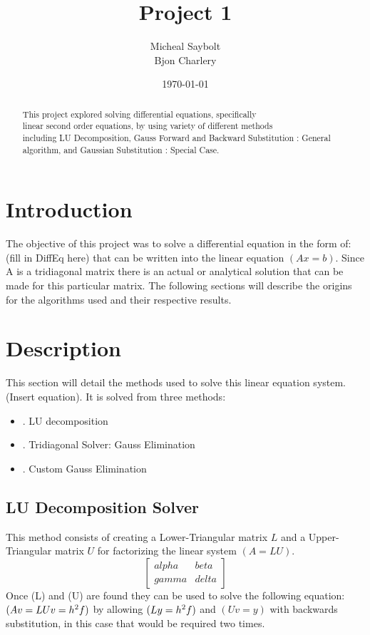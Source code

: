 \documentclass[12pt]{article}
\begin{document}
	\title{Project 1}
	\author{Micheal Saybolt \\ Bjon Charlery}
	
	\date{\today}
	\maketitle
	\pagebreak
\begin{abstract}
This project explored solving differential equations, specifically \\linear second order equations, by using variety of different methods \\including LU Decomposition, Gauss Forward and Backward Substitution : General algorithm, and Gaussian Substitution : Special Case.
\end{abstract}
\bigskip
\bigskip
\section{Introduction}
\indent The objective of this project was to solve a differential equation in the form of: (fill in DiffEq here) that can be written into the linear equation $(Ax = b)$. Since A is a tridiagonal matrix there is an actual or analytical solution that can be made for this particular matrix. The following sections will describe the origins for the algorithms used and their respective results.
\section{Description}
This section will detail the methods used to solve this linear equation system.(Insert equation). It is solved from three methods:\\
\begin{itemize}
	\item. \centering LU decomposition
	\item. \centering Tridiagonal Solver: Gauss Elimination\\
	\item. \centering Custom Gauss Elimination\\
\end{itemize}
\subsection{LU Decomposition Solver}
This method consists of creating a Lower-Triangular matrix $L$ and a Upper-Triangular matrix $U$ for factorizing the linear system $(A = LU)$.\\
$$
\begin{bmatrix}
	alpha& beta\\
	gamma& delta
\end{bmatrix}
$$
Once (L) and (U) are found they can be used to solve the following equation: $(Av = LUv = h\textsuperscript{2} f)$ by allowing $(Ly = h\textsuperscript{2}f)$ and $(Uv = y)$ with backwards substitution, in this case that would be required two times.
\end{document}

